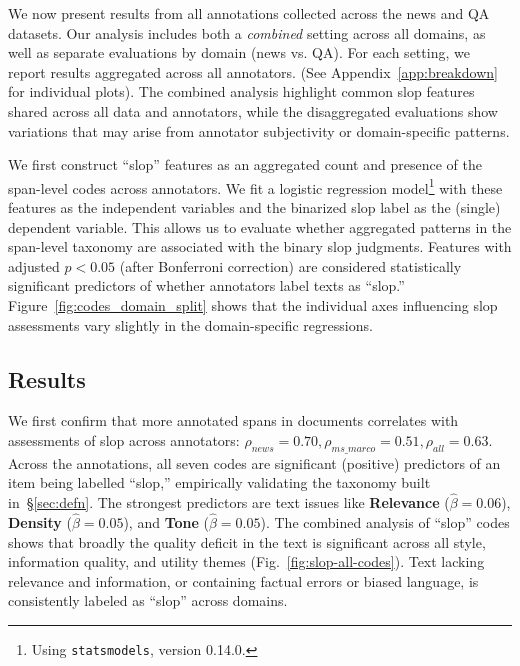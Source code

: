 \documentclass{article} %
\begin{document}
\newcommand{\hliq}[1]{\sethlcolor{infoqualityhl}\hl{#1}}
\newcommand{\hliu}[1]{\sethlcolor{infoutilityhl}\hl{#1}}
\newcommand{\hlsq}[1]{\sethlcolor{stylequalityhl}\hl{#1}}


\newcommand{\greyX}{\textcolor{lightred}{\ding{55}}}
\newcommand{\greencheck}{\textcolor{neutralgreen}{\ding{51}}}

We now present results from all annotations collected across the news and QA datasets. 
Our analysis includes both a \textit{combined} setting across all domains, as well as separate evaluations by domain (news vs. QA). 
For each setting, we report results aggregated across all annotators.
(See Appendix~\ref{app:breakdown} for individual plots). 
The combined analysis highlight common slop features shared across all data and annotators, while the disaggregated evaluations show  variations that may arise from annotator subjectivity or domain-specific patterns.

We first construct ``slop'' features as an aggregated count and presence of the span-level codes across annotators. We fit a logistic regression model\footnote{Using {\tt statsmodels}, version 0.14.0.} with these features as the independent variables and the binarized slop label as the (single) dependent variable.
This allows us to evaluate whether aggregated patterns in the span-level taxonomy are associated with the binary slop judgments. 
Features with adjusted $p<0.05$ (after Bonferroni correction) are considered statistically significant predictors of whether annotators label texts as ``slop.'' Figure~\ref{fig:codes_domain_split} shows that the individual axes influencing slop assessments vary slightly in the domain-specific regressions. 


\subsection{Results}
\label{sec:results_combined}

We first confirm that more annotated spans in  documents correlates with assessments of slop across annotators: $\rho_{news} = 0.70, \rho_{ms\_marco} = 0.51, \rho_{all} = 0.63$. 
Across the annotations, all seven codes are significant (positive) predictors of an item being labelled ``slop,'' empirically validating the taxonomy built in~\S\ref{sec:defn}.
The strongest predictors are text issues like  \textbf{Relevance} ($\hat{\beta}=0.06$), \textbf{Density} ($\hat{\beta}=0.05$), and \textbf{Tone} ($\hat{\beta}=0.05$).
The combined analysis of ``slop'' codes shows that broadly the quality deficit in the text is significant across all style, information quality, and utility themes (Fig.~\ref{fig:slop-all-codes}). Text lacking relevance and information, or containing factual errors or biased language, is consistently labeled as ``slop'' across domains. 
\end{document}
